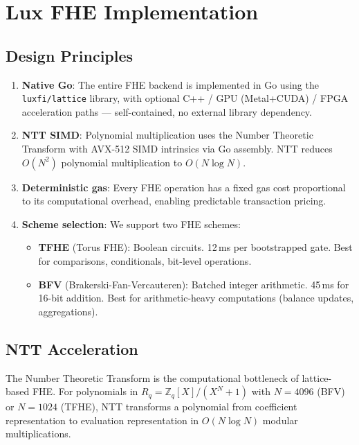 \section{Lux FHE Implementation}

\label{sec:implementation}

\subsection{Design Principles}

\begin{enumerate}[leftmargin=2em]
  \item \textbf{Native Go}: The entire FHE backend is implemented in Go using the
        \texttt{luxfi/lattice} library, with optional C++ / GPU (Metal+CUDA) / FPGA
        acceleration paths --- self-contained, no external library dependency.
  \item \textbf{NTT SIMD}: Polynomial multiplication uses the Number Theoretic
        Transform with AVX-512 SIMD intrinsics via Go assembly. NTT reduces
        $O(N^2)$ polynomial multiplication to $O(N \log N)$.
  \item \textbf{Deterministic gas}: Every FHE operation has a fixed gas cost
        proportional to its computational overhead, enabling predictable transaction
        pricing.
  \item \textbf{Scheme selection}: We support two FHE schemes:
        \begin{itemize}
          \item \textbf{TFHE} (Torus FHE): Boolean circuits. 12\,ms per bootstrapped
                gate. Best for comparisons, conditionals, bit-level operations.
          \item \textbf{BFV} (Brakerski-Fan-Vercauteren): Batched integer arithmetic.
                45\,ms for 16-bit addition. Best for arithmetic-heavy computations
                (balance updates, aggregations).
        \end{itemize}
\end{enumerate}

\subsection{NTT Acceleration}

The Number Theoretic Transform is the computational bottleneck of lattice-based FHE.
For polynomials in $R_q = \mathbb{Z}_q[X]/(X^N + 1)$ with $N = 4096$ (BFV) or
$N = 1024$ (TFHE), NTT transforms a polynomial from coefficient representation to
evaluation representation in $O(N \log N)$ modular multiplications.

